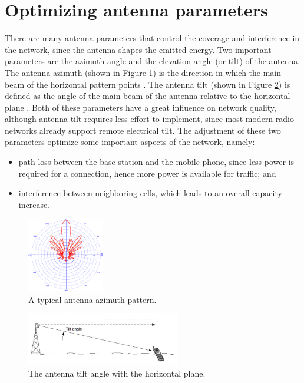 \section{Optimizing antenna parameters}

There are many antenna parameters that control the coverage and interference
in the network, since the antenna shapes the emitted energy. Two important
parameters are the azimuth angle and the elevation angle (or tilt)
of the antenna. The antenna azimuth (shown in Figure \ref{fig:Antenna-azimuth})
is the direction in which the main beam of the horizontal pattern
points \cite{WCDMAforUMTS_RadioAccessForThirdGenerationMobileCommunications}.
The antenna tilt (shown in Figure \ref{fig:Antenna-tilt}) is defined
as the angle of the main beam of the antenna relative to the horizontal
plane \cite{WCDMAforUMTS_RadioAccessForThirdGenerationMobileCommunications}.
Both of these parameters have a great influence on network quality,
although antenna tilt requires less effort to implement, since most
modern radio networks already support remote electrical tilt. The
adjustment of these two parameters optimize some important aspects
of the network, namely:
\begin{itemize}
\item path loss between the base station and the mobile phone, since less
power is required for a connection, hence more power is available
for traffic; and
\item interference between neighboring cells, which leads to an overall
capacity increase.
\end{itemize}
\begin{figure}[h]
\centering

\includegraphics[width=0.3\textwidth]{02-background_and_motivation/img/azimuth}

\caption{A typical antenna azimuth pattern.\label{fig:Antenna-azimuth}}
\end{figure}


\begin{figure}
\centering

\includegraphics[width=0.6\textwidth]{02-background_and_motivation/img/tilt}

\caption{The antenna tilt angle with the horizontal plane.\label{fig:Antenna-tilt}}
\end{figure}




